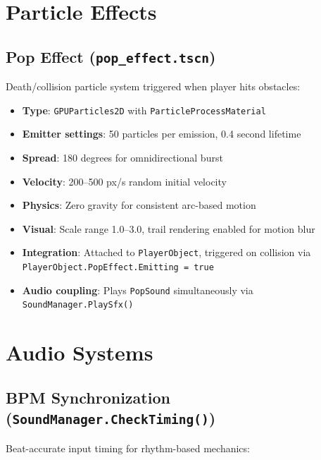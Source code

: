 \documentclass{report}
\begin{document}
\chapter{Particle Effects}
\section{Pop Effect (\texttt{pop\_effect.tscn})}
Death/collision particle system triggered when player hits obstacles:

\begin{itemize}[noitemsep]
	\item \textbf{Type}: \texttt{GPUParticles2D} with \texttt{ParticleProcessMaterial}
	\item \textbf{Emitter settings}: 50 particles per emission, 0.4 second lifetime
	\item \textbf{Spread}: 180 degrees for omnidirectional burst
	\item \textbf{Velocity}: 200--500 px/s random initial velocity
	\item \textbf{Physics}: Zero gravity for consistent arc-based motion
	\item \textbf{Visual}: Scale range 1.0--3.0, trail rendering enabled for motion blur
	\item \textbf{Integration}: Attached to \texttt{PlayerObject}, triggered on collision via \texttt{PlayerObject.PopEffect.Emitting = true}
	\item \textbf{Audio coupling}: Plays \texttt{PopSound} simultaneously via \texttt{SoundManager.PlaySfx()}
\end{itemize}

\chapter{Audio Systems}
\section{BPM Synchronization (\texttt{SoundManager.CheckTiming()})}
Beat-accurate input timing for rhythm-based mechanics:
\end{document}
